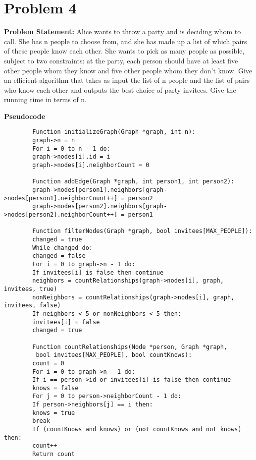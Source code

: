 \documentclass[a4paper,12pt]{report}
\begin{document}
\newpage
\section*{Problem 4}

\textbf{Problem Statement:}   Alice wants to throw a party and is deciding whom to call. She has n people to choose from, and she has made up a list of which pairs of these people know each other. She wants to pick as many people as possible, subject to two constraints: at the party, each person should have at least five other people whom they know and five other people whom they don’t know. Give an efficient algorithm that takes as input the list of n people and the list of pairs who know each other and outputs the best choice of party invitees. Give the running time in terms of n.


\textbf{Pseudocode}

\begin{tcolorbox}[colback=white, colframe=black, boxrule=0.5pt]
	\ttfamily\small
	\begin{verbatim}
		Function initializeGraph(Graph *graph, int n):
		graph->n = n
		For i = 0 to n - 1 do:
		graph->nodes[i].id = i
		graph->nodes[i].neighborCount = 0
		
		Function addEdge(Graph *graph, int person1, int person2):
		graph->nodes[person1].neighbors[graph->nodes[person1].neighborCount++] = person2
		graph->nodes[person2].neighbors[graph->nodes[person2].neighborCount++] = person1
		
		Function filterNodes(Graph *graph, bool invitees[MAX_PEOPLE]):
		changed = true
		While changed do:
		changed = false
		For i = 0 to graph->n - 1 do:
		If invitees[i] is false then continue
		neighbors = countRelationships(graph->nodes[i], graph, invitees, true)
		nonNeighbors = countRelationships(graph->nodes[i], graph, invitees, false)
		If neighbors < 5 or nonNeighbors < 5 then:
		invitees[i] = false
		changed = true
		
		Function countRelationships(Node *person, Graph *graph,
		 bool invitees[MAX_PEOPLE], bool countKnows):
		count = 0
		For i = 0 to graph->n - 1 do:
		If i == person->id or invitees[i] is false then continue
		knows = false
		For j = 0 to person->neighborCount - 1 do:
		If person->neighbors[j] == i then:
		knows = true
		break
		If (countKnows and knows) or (not countKnows and not knows) then:
		count++
		Return count
	\end{verbatim}
\end{tcolorbox}
\newpage
\end{document}
